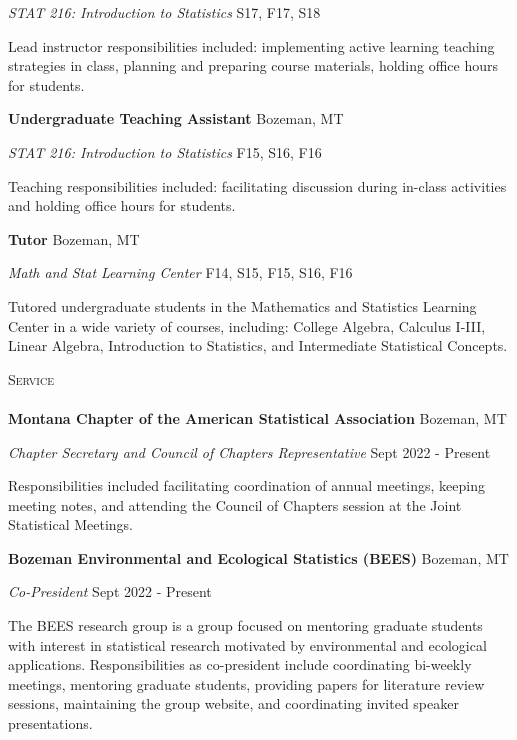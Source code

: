 \documentclass[a4paper]{article}
\newcommand{\lineunder} {
	\vspace*{-8pt} \\
	\hspace*{-18pt} \hrulefill \\
}
\newcommand{\header} [1] {
	{\hspace*{-18pt}\vspace*{6pt} \textsc{#1}}
	\vspace*{-6pt} \lineunder
}
\begin{document}
\emph{STAT 216: Introduction to Statistics} \hfill S17, F17, S18

Lead instructor responsibilities included: implementing active learning
teaching strategies in class, planning and preparing course materials,
holding office hours for students. \vspace*{2mm}

\textbf{Undergraduate Teaching Assistant} \hfill Bozeman, MT

\emph{STAT 216: Introduction to Statistics} \hfill F15, S16, F16

Teaching responsibilities included: facilitating discussion during
in-class activities and holding office hours for students. \vspace*{2mm}

\textbf{Tutor} \hfill Bozeman, MT

\emph{Math and Stat Learning Center} \hfill F14, S15, F15, S16, F16

Tutored undergraduate students in the Mathematics and Statistics
Learning Center in a wide variety of courses, including: College
Algebra, Calculus I-III, Linear Algebra, Introduction to Statistics, and
Intermediate Statistical Concepts.\vspace*{2mm}

\header{Service}

\textbf{Montana Chapter of the American Statistical Association}
\hfill Bozeman, MT

\emph{Chapter Secretary and Council of Chapters Representative}
\hfill Sept 2022 - Present

Responsibilities included facilitating coordination of annual meetings,
keeping meeting notes, and attending the Council of Chapters session at
the Joint Statistical Meetings. \vspace*{2mm}

\textbf{Bozeman Environmental and Ecological Statistics (BEES)}
\hfill Bozeman, MT

\emph{Co-President} \hfill Sept 2022 - Present

The BEES research group is a group focused on mentoring graduate
students with interest in statistical research motivated by
environmental and ecological applications. Responsibilities as
co-president include coordinating bi-weekly meetings, mentoring graduate
students, providing papers for literature review sessions, maintaining
the group website, and coordinating invited speaker presentations.
\vspace*{2mm}
\end{document}
